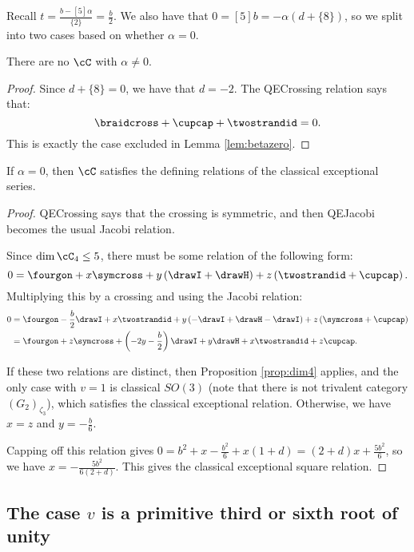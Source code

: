 \documentclass[12pt]{amsart}
\begin{document}
Recall $t = \frac{b-[5]\alpha}{\{2\}} = \frac{b}{2}$.  We also have that $0= [5]b = -\alpha (d+\{8\})$, so we split into two cases based on whether $\alpha = 0$.

\begin{lemma}
There are no $\cC$ with $\alpha \neq 0$.
\end{lemma}
\begin{proof}
Since $d+\{8\}=0$, we have that $d=-2$.  The QECrossing relation says that:
$$\braidcross + \cupcap + \twostrandid = 0.$$
This is exactly the case excluded in Lemma \ref{lem:betazero}.
\end{proof}

\begin{lemma}
If $\alpha = 0$, then $\cC$ satisfies the defining relations of the classical exceptional series.
\end{lemma}
\begin{proof}
QECrossing says that the crossing is symmetric, and then QEJacobi becomes the usual Jacobi relation. 

Since $\dim \cC_4 \leq 5$, there must be some relation of the following form:
$$0 = \fourgon + x \symcross + y \left(\drawI + \drawH \right) + z\left(\twostrandid + \cupcap \right).$$
Multiplying this by a crossing and using the Jacobi relation:
\begin{align*}
0 &= \fourgon - \frac{b}{2} \drawI + x \twostrandid + y \left(-\drawI + \drawH -\drawI \right) + z\left(\symcross + \cupcap \right) 
\\ &= \fourgon + z \symcross + \left(-2y -\frac{b}{2} \right) \drawI +y \drawH +x \twostrandid + z\cupcap. 
\end{align*}

If these two relations are distinct, then Proposition \ref{prop:dim4} applies, and the only case with $v=1$ is classical $SO(3)$ (note that there is not trivalent category $(G_2)_{\zeta_3}$), which satisfies the classical exceptional relation.  Otherwise, we have $x=z$ and $y = -\frac{b}{6}$.  

Capping off this relation gives $0 = b^2 + x -\frac{b^2}{6}+x(1+d) =  (2+d)x +\frac{5 b^2}{6}$, so we have $x = -\frac{5 b^2}{6(2+d)}$.  This gives the classical exceptional square relation.
\end{proof}


\subsection{The case \texorpdfstring{$v$}{v} is a primitive third or sixth root of unity}
\end{document}
